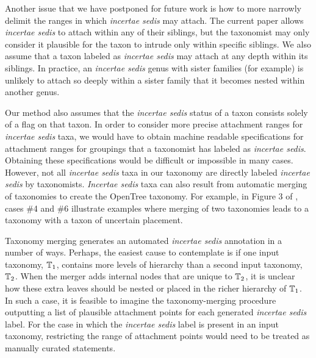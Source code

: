 \documentclass[english]{article}
\begin{document}
Another issue that we have postponed for future work is how to more narrowly delimit
the ranges in which \emph{incertae sedis} may attach.  The current paper allows
\emph{incertae sedis} to attach within any of their siblings, but the taxonomist
may only consider it plausible for the taxon to intrude only within specific
siblings.  We also assume that a taxon labeled as \emph{incertae sedis} may
attach at any depth within its siblings. In practice, an \emph{incertae sedis}
genus with sister families (for example) is unlikely to attach so deeply within
a sister family that it becomes nested within another genus.

Our method also assumes that the \emph{incertae sedis} status of a taxon
consists solely of a flag on that taxon.  In order to consider more precise
attachment ranges for \emph{incertae sedis} taxa, we would have to obtain
machine readable specifications for attachment ranges for groupings that a
taxonomist has labeled as \emph{incertae sedis}.  Obtaining these specifications
would be difficult or impossible in many cases. However, not all \emph{incertae
sedis} taxa in our taxonomy are directly labeled \emph{incertae sedis} by
taxonomists. \emph{Incertae sedis} taxa can also result from automatic merging
of taxonomies to create the OpenTree taxonomy. For example, in Figure 3 of
\citet{rees2017automated}, cases \#4 and \#6 illustrate examples where merging
of two taxonomies leads to a taxonomy with a taxon of uncertain placement.

Taxonomy merging generates an automated \emph{incertae sedis} annotation
in a number of ways. Perhaps, the easiest cause to contemplate is if
one input taxonomy, $\mbox{\ensuremath{\mathbb{T}}}_{1}$, contains more levels of hierarchy than a second
input taxonomy, $\mbox{\ensuremath{\mathbb{T}}}_{2}$.
When the merger adds internal nodes that are unique to $\mbox{\ensuremath{\mathbb{T}}}_{2}$,
it is unclear how these
extra leaves should be nested or placed in the richer hierarchy of $\mbox{\ensuremath{\mathbb{T}}}_1$.
In such a case, it is feasible to imagine the taxonomy-merging procedure outputting
    a list of plausible attachment points for each generated \emph{incertae sedis}
    label.
For the case in which the \emph{incertae sedis} label is present in an input taxonomy,
    restricting the range of attachment points would need to be treated as
    manually curated statements. 






\end{document}
